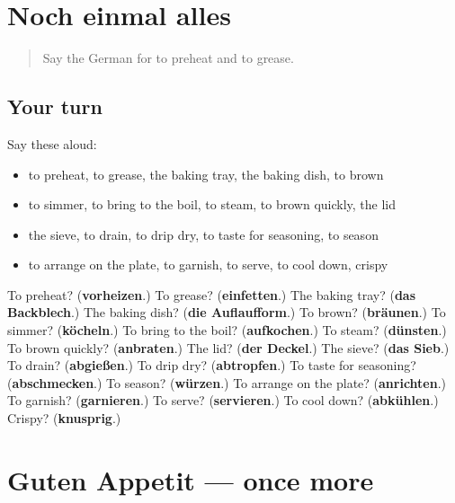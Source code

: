 \section[(dialogue)]{Noch einmal alles}

\label{lesson:GE-R329-review-326-329}



\begin{quote}
Say the German for to preheat and to grease.
\end{quote}

\subsection*{Your turn}
Say these aloud:

\begin{itemize}
\raggedright
  \item to preheat, to grease, the baking tray, the baking dish, to brown
  \item to simmer, to bring to the boil, to steam, to brown quickly, the lid
  \item the sieve, to drain, to drip dry, to taste for seasoning, to season
  \item to arrange on the plate, to garnish, to serve, to cool down, crispy
\end{itemize}

\begin{tcolorbox}[breakable,colback=teal!4,colframe=teal!35!black,title={Before you move on}]
To preheat? (\textbf{vorheizen}.) To grease? (\textbf{einfetten}.) The baking tray? (\textbf{das Backblech}.) The baking dish? (\textbf{die Auflaufform}.) To brown? (\textbf{bräunen}.) To simmer? (\textbf{köcheln}.) To bring to the boil? (\textbf{aufkochen}.) To steam? (\textbf{dünsten}.) To brown quickly? (\textbf{anbraten}.) The lid? (\textbf{der Deckel}.) The sieve? (\textbf{das Sieb}.) To drain? (\textbf{abgießen}.) To drip dry? (\textbf{abtropfen}.) To taste for seasoning? (\textbf{abschmecken}.) To season? (\textbf{würzen}.) To arrange on the plate? (\textbf{anrichten}.) To garnish? (\textbf{garnieren}.) To serve? (\textbf{servieren}.) To cool down? (\textbf{abkühlen}.) Crispy? (\textbf{knusprig}.)
\end{tcolorbox}
\section[(dialogue)]{Guten Appetit — once more}

\label{lesson:GE-R329-review-final-329}




